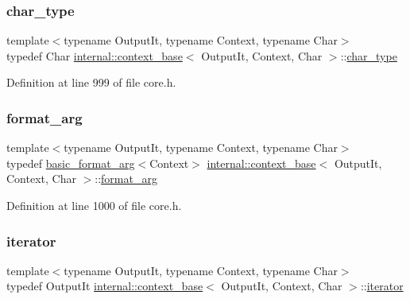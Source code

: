 \subsubsection{\texorpdfstring{char\+\_\+type}{char\_type}}
{\footnotesize\ttfamily template$<$typename Output\+It, typename Context, typename Char$>$ \\
typedef Char \hyperlink{classinternal_1_1context__base}{internal\+::context\+\_\+base}$<$ Output\+It, Context, Char $>$\+::\hyperlink{classinternal_1_1context__base_a012818dce2cbba8d267491288b9f3f63}{char\+\_\+type}\hspace{0.3cm}{\ttfamily [protected]}}



Definition at line 999 of file core.\+h.

\mbox{\label{classinternal_1_1context__base_aa0c806d3176db7f4c5e5a0fa08561102}} 
\subsubsection{\texorpdfstring{format\+\_\+arg}{format\_arg}}
{\footnotesize\ttfamily template$<$typename Output\+It, typename Context, typename Char$>$ \\
typedef \hyperlink{classbasic__format__arg}{basic\+\_\+format\+\_\+arg}$<$Context$>$ \hyperlink{classinternal_1_1context__base}{internal\+::context\+\_\+base}$<$ Output\+It, Context, Char $>$\+::\hyperlink{classinternal_1_1context__base_aa0c806d3176db7f4c5e5a0fa08561102}{format\+\_\+arg}\hspace{0.3cm}{\ttfamily [protected]}}



Definition at line 1000 of file core.\+h.

\mbox{\label{classinternal_1_1context__base_a6486e3c9656c10eb99a4731fb169e51b}} 
\subsubsection{\texorpdfstring{iterator}{iterator}}
{\footnotesize\ttfamily template$<$typename Output\+It, typename Context, typename Char$>$ \\
typedef Output\+It \hyperlink{classinternal_1_1context__base}{internal\+::context\+\_\+base}$<$ Output\+It, Context, Char $>$\+::\hyperlink{classinternal_1_1context__base_a6486e3c9656c10eb99a4731fb169e51b}{iterator}}



